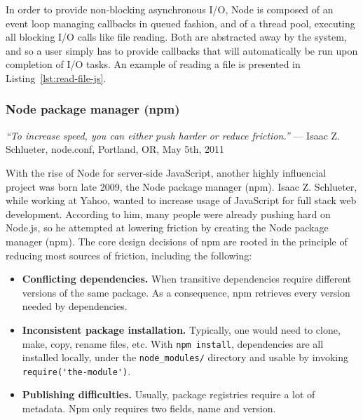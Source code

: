 In order to provide non-blocking asynchronous I/O,
Node is composed of an event loop managing callbacks in queued fashion,
and of a thread pool, executing all blocking I/O calls like file reading.
Both are abstracted away by the system, and so a user simply has
to provide callbacks that will automatically be run upon completion of I/O tasks.
An example of reading a file is presented in Listing~\ref{lst:read-file-js}.




\subsubsection{Node package manager (\textsf{npm})}%
\label{ssub:node_package_manager_npm_}

\begin{displayquote}
	\textit{``To increase speed, you can either push harder or reduce friction.''}
	--- Isaac Z. Schlueter, node.conf, Portland, OR, May 5th, 2011
\end{displayquote}

With the rise of Node for server-side JavaScript,
another highly influencial project was born late 2009,
the Node package manager (\textsf{npm}).
Isaac Z. Schlueter, while working at Yahoo, wanted to increase usage
of JavaScript for full stack web development.
According to him, many people were already pushing hard on Node.js,
so he attempted at lowering friction by creating the Node package manager (\textsf{npm}).
The core design decisions of \textsf{npm} are rooted in the principle of reducing
most sources of friction, including the following:

\begin{itemize}
	\item \textbf{Conflicting dependencies.}
		When transitive dependencies require different versions of the same package.
		As a consequence, \textsf{npm} retrieves every version needed by dependencies.
	\item \textbf{Inconsistent package installation.}
		Typically, one would need to clone, make, copy, rename files, etc.
		With \verb|npm install|, dependencies are all installed locally,
		under the \verb|node_modules/| directory and usable by invoking
		\verb|require('the-module')|.
	\item \textbf{Publishing difficulties.}
		Usually, package registries require a lot of metadata.
		\textsf{Npm} only requires two fields, name and version.
\end{itemize}

